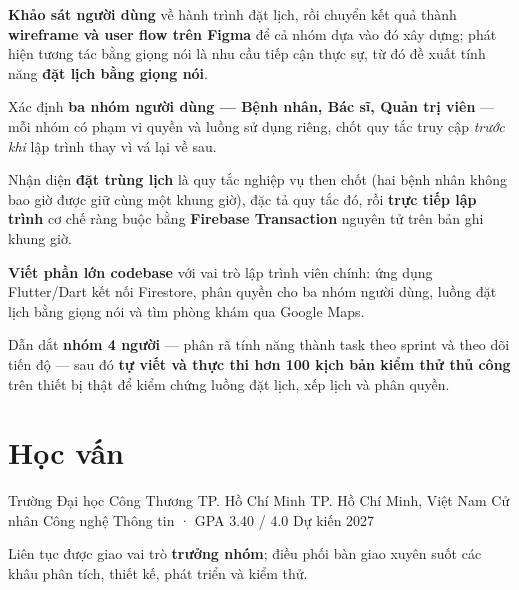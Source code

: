 \documentclass[a4paper,9pt]{extarticle}
\begin{document}

\begin{cvBullets}
  \item \textbf{Khảo sát người dùng} về hành trình đặt lịch, rồi chuyển kết quả thành \textbf{wireframe và user flow trên Figma} để cả nhóm dựa vào đó xây dựng; phát hiện tương tác bằng giọng nói là nhu cầu tiếp cận thực sự, từ đó đề xuất tính năng \textbf{đặt lịch bằng giọng nói}.
  \item Xác định \textbf{ba nhóm người dùng — Bệnh nhân, Bác sĩ, Quản trị viên} — mỗi nhóm có phạm vi quyền và luồng sử dụng riêng, chốt quy tắc truy cập \textit{trước khi} lập trình thay vì vá lại về sau.
  \item Nhận diện \textbf{đặt trùng lịch} là quy tắc nghiệp vụ then chốt (hai bệnh nhân không bao giờ được giữ cùng một khung giờ), đặc tả quy tắc đó, rồi \textbf{trực tiếp lập trình} cơ chế ràng buộc bằng \textbf{Firebase Transaction} nguyên tử trên bản ghi khung giờ.
  \item \textbf{Viết phần lớn codebase} với vai trò lập trình viên chính: ứng dụng Flutter/Dart kết nối Firestore, phân quyền cho ba nhóm người dùng, luồng đặt lịch bằng giọng nói và tìm phòng khám qua Google Maps.
  \item Dẫn dắt \textbf{nhóm 4 người} — phân rã tính năng thành task theo sprint và theo dõi tiến độ — sau đó \textbf{tự viết và thực thi hơn 100 kịch bản kiểm thử thủ công} trên thiết bị thật để kiểm chứng luồng đặt lịch, xếp lịch và phân quyền.
\end{cvBullets}


\section{Học vấn}

\cvSchool
  {Trường Đại học Công Thương TP. Hồ Chí Minh}
  {TP. Hồ Chí Minh, Việt Nam}
  {Cử nhân Công nghệ Thông tin · GPA 3.40 / 4.0}
  {Dự kiến 2027}

\begin{cvBullets}
  \item Liên tục được giao vai trò \textbf{trưởng nhóm}; điều phối bàn giao xuyên suốt các khâu phân tích, thiết kế, phát triển và kiểm thử.
\end{cvBullets}
\end{document}
